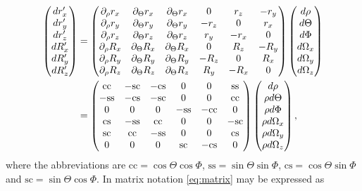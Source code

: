\documentclass{article}
\numberwithin{equation}{section}
\numberwithin{figure}{section}
\begin{document}
\begin{align}
\begin{pmatrix}
dr'_x \\
dr'_y \\
dr'_z \\
dR'_x \\
dR'_y \\
dR'_z\\
\end{pmatrix} 
&= 
\begin{pmatrix*}[c]
\partial_{\rho} r_x & \partial_{\Theta} r_x & \partial_{\Theta} r_x & 0 & r_z & -r_y\\
\partial_{\rho} r_y & \partial_{\Theta} r_y & \partial_{\Theta} r_y & -r_z & 0 & r_x\\
\partial_{\rho} r_z & \partial_{\Theta} r_z & \partial_{\Theta} r_z & r_y & -r_x & 0\\
\partial_{\rho} R_x & \partial_{\Theta} R_x & \partial_{\Theta} R_x & 0 & R_z & -R_y\\
\partial_{\rho} R_y & \partial_{\Theta} R_y & \partial_{\Theta} R_y & -R_z & 0 & R_x\\
\partial_{\rho} R_z & \partial_{\Theta} R_z & \partial_{\Theta} R_z & R_y & -R_x & 0\\
\end{pmatrix*}
\begin{pmatrix}
d\rho\\
d\Theta\\
d\Phi\\
d\Omega_x\\
d\Omega_y\\
d\Omega_z\\
\end{pmatrix} \notag \\
&=
\begin{pmatrix*}[c]
\mathrm{cc} & \mathrm{-sc} & \mathrm{-cs} & 0 & 0 & \mathrm{ss}\\
\mathrm{-ss} & \mathrm{-cs} & \mathrm{-sc} & 0 & 0 & \mathrm{cc}\\
0 & 0 & 0 & \mathrm{-ss} & \mathrm{-cc} & 0\\
\mathrm{cs} & \mathrm{-ss} & \mathrm{cc} & 0 & 0 & \mathrm{-sc}\\
\mathrm{sc} & \mathrm{cc} & \mathrm{-ss} & 0 & 0 & \mathrm{cs}\\
0 & 0 & 0 & \mathrm{sc} & \mathrm{-cs} & 0\\
\end{pmatrix*}
\begin{pmatrix}
d\rho\\
\rho d\Theta\\
\rho d\Phi\\
\rho d\Omega_x\\
\rho d\Omega_y\\
\rho d\Omega_z\\
\end{pmatrix},\label{eq:matrix}
\end{align}
where the abbreviations are $\mathrm{cc} = \cos\Theta\cos\Phi$, $\mathrm{ss} = \sin\Theta\sin\Phi$, $\mathrm{cs} = \cos\Theta\sin\Phi$ and $\mathrm{sc} = \sin\Theta\cos\Phi$. In matrix notation \eqref{eq:matrix} may be expressed as
\end{document}
